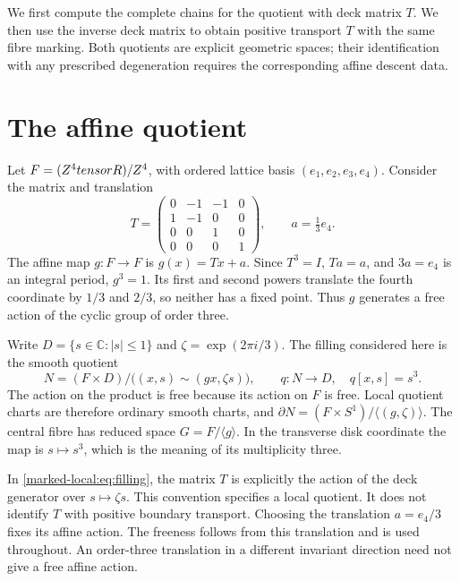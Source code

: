 We first compute the complete chains for the quotient with deck
matrix $T$. We then use the inverse deck matrix to obtain positive
transport $T$ with the same fibre marking. Both quotients are
explicit geometric spaces; their identification with any prescribed
degeneration requires the corresponding affine descent data.


\section{The affine quotient}

Let $F=(Z^4tensorR)/Z^4$, with ordered lattice basis
$(e_1,e_2,e_3,e_4)$. Consider the matrix and translation
\begin{equation}\label{marked-local:eq:native-data}
 T=\begin{pmatrix}
 0&-1&-1&0\\1&-1&0&0\\0&0&1&0\\0&0&0&1
 \end{pmatrix},\qquad a=\tfrac13e_4.
\end{equation}
The affine map $g:F\to F$ is $g(x)=Tx+a$.
Since $T^3=I$, $Ta=a$, and $3a=e_4$ is an integral period,
$g^3=1$. Its first and second powers translate the fourth coordinate
by $1/3$ and $2/3$, so neither has a fixed point. Thus $g$ generates
a free action of the cyclic group of order three.

Write $D=\{s\in\mathbb C:|s|\le1\}$ and
$\zeta=\exp(2\pi i/3)$. The filling considered here is the smooth
quotient
\begin{equation}\label{marked-local:eq:filling}
 N=(F\times D)/\bigl((x,s)\sim(gx,\zeta s)\bigr),
 \qquad q:N\longrightarrow D,\quad q[x,s]=s^3.
\end{equation}
The action on the product is free because its action on $F$ is free.
Local quotient charts are therefore ordinary smooth charts, and
$\partial N=(F\times S^1)/\langle(g,\zeta)\rangle$.
The central fibre has reduced space $G=F/\langle g\rangle$.
In the transverse disk coordinate the map is $s\mapsto s^3$, which
is the meaning of its multiplicity three.

In \eqref{marked-local:eq:filling}, the matrix $T$ is explicitly the action of
the deck generator over $s\mapsto\zeta s$. This convention specifies
a local quotient. It does not identify $T$ with positive boundary
transport. Choosing the translation $a=e_4/3$ fixes its affine action. The freeness follows from this
translation and is used throughout. An order-three translation in a
different invariant direction need not give a free affine action.

